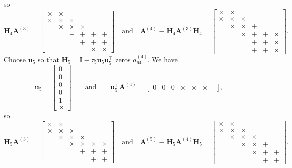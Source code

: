 \documentclass[12pt,a4paper]{article}
\begin{document}
so
\[
\boldsymbol{H}_4\boldsymbol{A}^{(3)}
      =\begin{bmatrix}
\times&\times&      &      &      &      \\
\times&\times&\times&      &      &      \\
      &\times&\times&\times&      \\
      &      &     +&     +&     +&     +\\
      &      &      &     +&     +&     +\\
      &      &      &      &\times&\times\end{bmatrix}
\quad\text{and}\quad
\boldsymbol{A}^{(4)}\equiv\boldsymbol{H}_4\boldsymbol{A}^{(3)}\boldsymbol{H}_4
      =\begin{bmatrix}
\times&\times&      &      &      &      \\
\times&\times&\times&      &      \\
      &\times&\times&     +&      &      \\
      &      &\times&     +&     +&\times\\
      &      &      &     +&     +&\times\\
      &      &      &     +&     +&\times\end{bmatrix}.
\]
Choose $\boldsymbol{u}_5$ so that
$\boldsymbol{H}_5=\boldsymbol{I}-\tau_5\boldsymbol{u}_5\boldsymbol{u}_5^\top$
zeros $a^{(4)}_{64}$. We have
\[
\boldsymbol{u}_5=\begin{bmatrix}0\\ 0\\ 0\\ 0\\ 1\\ \times\end{bmatrix}
\qquad\text{and}\qquad
\boldsymbol{u}_5^\top\boldsymbol{A}^{(4)}
=\begin{bmatrix}0&0&0&\times&\times&\times&\end{bmatrix},
\]
so
\[
\boldsymbol{H}_5\boldsymbol{A}^{(3)}
      =\begin{bmatrix}
\times&\times&      &      &      &      \\
\times&\times&\times&      &      \\
      &\times&\times&\times&      &      \\
      &      &\times&\times&\times&\times\\
      &      &      &     +&     +&     +\\
      &      &      &      &     +&     +\end{bmatrix}
\quad\text{and}\quad
\boldsymbol{A}^{(5)}\equiv\boldsymbol{H}_5\boldsymbol{A}^{(4)}\boldsymbol{H}_5
      =\begin{bmatrix}
\times&\times&      &      &      &      \\
\times&\times&\times&      &      \\
      &\times&\times&\times&      &      \\
      &      &\times&\times&     +&      \\
      &      &      &\times&     +&     +\\
      &      &      &      &     +&     +\end{bmatrix}.
\]
\end{document}
